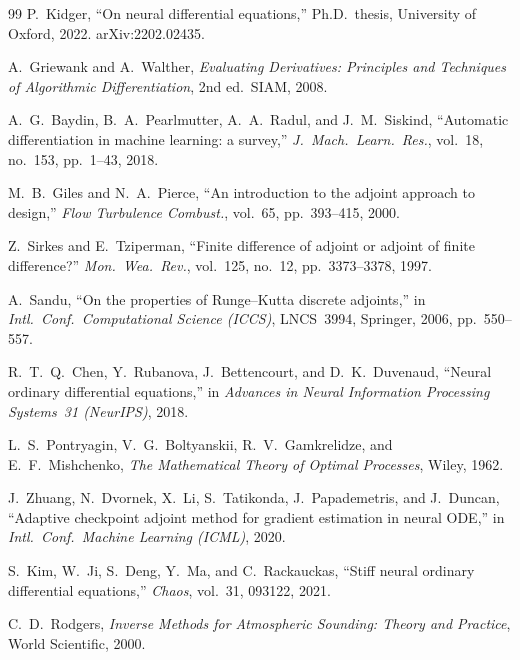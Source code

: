 \documentclass[11pt,a4paper]{article}
\theoremstyle{definition}
\begin{document}
\begin{thebibliography}{99}
  P.~Kidger,
  ``On neural differential equations,''
  Ph.D.\ thesis, University of Oxford, 2022.
  arXiv:2202.02435.

  A.~Griewank and A.~Walther,
  \emph{Evaluating Derivatives: Principles and Techniques of
  Algorithmic Differentiation}, 2nd ed.\
  SIAM, 2008.

  A.~G.~Baydin, B.~A.~Pearlmutter, A.~A.~Radul, and J.~M.~Siskind,
  ``Automatic differentiation in machine learning: a survey,''
  \emph{J.\ Mach.\ Learn.\ Res.}, vol.~18, no.~153, pp.~1--43, 2018.

\bibitem{giles2000}
  M.~B.~Giles and N.~A.~Pierce,
  ``An introduction to the adjoint approach to design,''
  \emph{Flow Turbulence Combust.}, vol.~65, pp.~393--415, 2000.

  Z.~Sirkes and E.~Tziperman,
  ``Finite difference of adjoint or adjoint of finite difference?''
  \emph{Mon.\ Wea.\ Rev.}, vol.~125, no.~12, pp.~3373--3378, 1997.

  A.~Sandu,
  ``On the properties of Runge--Kutta discrete adjoints,''
  in \emph{Intl.\ Conf.\ Computational Science (ICCS)},
  LNCS~3994, Springer, 2006, pp.~550--557.

  R.~T.~Q.~Chen, Y.~Rubanova, J.~Bettencourt, and D.~K.~Duvenaud,
  ``Neural ordinary differential equations,''
  in \emph{Advances in Neural Information Processing Systems~31
  (NeurIPS)}, 2018.

  L.~S.~Pontryagin, V.~G.~Boltyanskii, R.~V.~Gamkrelidze, and
  E.~F.~Mishchenko,
  \emph{The Mathematical Theory of Optimal Processes},
  Wiley, 1962.

  J.~Zhuang, N.~Dvornek, X.~Li, S.~Tatikonda, J.~Papademetris,
  and J.~Duncan,
  ``Adaptive checkpoint adjoint method for gradient estimation in
  neural ODE,''
  in \emph{Intl.\ Conf.\ Machine Learning (ICML)}, 2020.

  S.~Kim, W.~Ji, S.~Deng, Y.~Ma, and C.~Rackauckas,
  ``Stiff neural ordinary differential equations,''
  \emph{Chaos}, vol.~31, 093122, 2021.

\bibitem{rodgers2000}
  C.~D.~Rodgers,
  \emph{Inverse Methods for Atmospheric Sounding: Theory and Practice},
  World Scientific, 2000.


\end{thebibliography}
\end{document}
